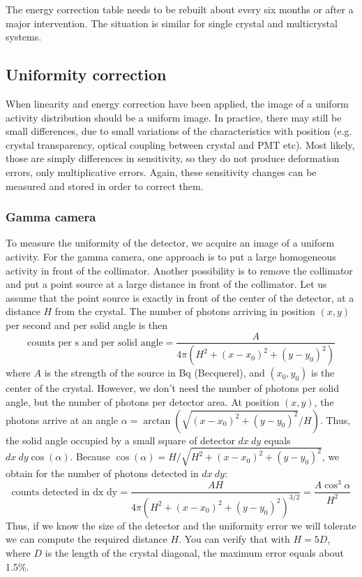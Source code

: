 \documentclass[11pt,oneside]{book}
\begin{document}
The energy correction table needs to be rebuilt about every six months or
after a major intervention. The situation is similar for single crystal and
multicrystal systems.


\subsection{Uniformity correction}
When linearity and energy correction have been applied, the image of a uniform
activity distribution should be a uniform image. In practice, there may still
be small differences, due to small variations of the characteristics with
position (e.g. crystal transparency, optical coupling between crystal and PMT
etc). Most likely, those are simply differences in sensitivity, so they do not
produce deformation errors, only multiplicative errors. Again, these
sensitivity changes can be measured and stored in order to correct them.

\subsubsection{Gamma camera}
To measure the uniformity of the detector, we acquire an image of
a uniform activity. For the gamma camera, one approach is to put a
large homogeneous activity in front of the collimator. Another
possibility is to remove the collimator and put a point source at a
large distance in front of the collimator. Let us assume that the
point source is exactly in front of the center of the detector, at a
distance $H$ from the crystal. The number of photons arriving in
position $(x,y)$ per second and per solid angle is then
\begin{equation}
  \mbox{counts  per s and per solid angle} 
     = \frac{A}{4 \pi (H^2 + (x-x_0)^2 +(y-y_0)^2)}
\end{equation}
where $A$ is the strength of the source in Bq (Becquerel), and $(x_0, y_0)$ is
the center of the crystal. However, we don't need the number of
photons per solid angle, but the number of photons per detector
area. At position $(x,y)$, the photons arrive at an angle 
$\alpha = \arctan(\sqrt{(x-x_0)^2 +(y-y_0)^2}/ H)$. Thus, the solid
angle occupied by a small square of detector $dx\ dy$ equals $dx\ dy
\cos(\alpha)$. Because $\cos(\alpha) = H / \sqrt{H^2 + (x-x_0)^2
  +(y-y_0)^2}$, we obtain for the number of photons detected in $dx\
dy$:
\begin{equation}
  \mbox{counts detected in dx dy} 
     = \frac{A H}{4 \pi (H^2 + (x-x_0)^2 +(y-y_0)^2)^{3/2}}
     = \frac{A \cos^3\alpha}{H^2}
\end{equation}
%
Thus, if we know the size of the detector and the uniformity error we
will tolerate we can compute the required distance $H$.  You can
verify that with $H = 5 D$, where $D$ is the length of the crystal diagonal,
the maximum error equals about 1.5\%.
\end{document}
